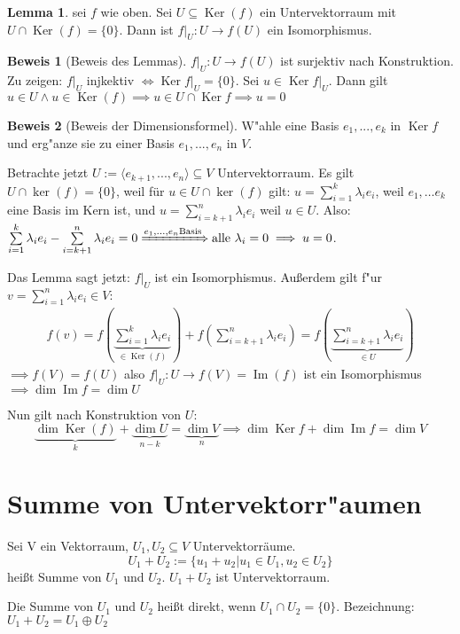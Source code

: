 \documentclass[oneside,fontsize=11pt,paper=a4,BCOR=0mm,DIV=12,automark,headsepline]{scrbook}
\DeclareMathOperator{\mdim}{dim}
\DeclareMathOperator{\mKer}{Ker}
\DeclareMathOperator{\mIm}{Im}
\theoremstyle{remark}
\theoremstyle{definition}
\newtheorem{lemma}{Lemma}[section]
\theoremstyle{definition}
\newtheorem*{prof}{Beweis}
\theoremstyle{remark}
\begin{document}
\begin{lemma} sei \(f\) wie oben. Sei \(U \subseteq \mKer(f)\) ein Untervektorraum mit \(U \cap \mKer(f) = \{0\}\).  Dann ist \(f|_U:U\to f(U)\) ein Isomorphismus.
\end{lemma}

\begin{prof}[Beweis des Lemmas]
  \(f|_U:U\to f(U)\) ist surjektiv nach Konstruktion. Zu zeigen: \(f|_U\) injkektiv \(\iff \mKer f|_U = \{0\}\). Sei \(u\in \mKer f|_U \). Dann gilt \(u\in U \land u \in \mKer(f) \implies u \in U \cap \mKer f \implies u = 0\)
\end{prof}

\begin{prof}[Beweis der Dimensionsformel]
  W"ahle eine Basis \({e_1, ..., e_k}\) in \(\mKer f\) und erg"anze sie zu einer Basis
  \({e_1, ..., e_n}\) in \(V\).

  Betrachte jetzt \(U:=\langle e_{k+1}, ..., e_n\rangle \subseteq V\) Untervektorraum. Es gilt $U \cap \ker(f) = \{0\}$, weil für $u\in U \cap \ker(f)$ gilt: \(u = \sum\limits_{i=1}^k \lambda_ie_i \), weil \(e_1, \dots e_k\) eine Basis im Kern ist, und \(u = \sum\limits_{i=k+1}^{n} \lambda_i e_i\) weil \(u\in U\). Also: \(\sum\limits_{i=1}^k \lambda_ie_i - \sum\limits_{i=k+1}^{n} \lambda_ie_i = 0 \xRightarrow{e_1,\dots, e_n \text{Basis}} \text{alle }\lambda_i = 0 \implies u =0\).

  Das Lemma sagt jetzt: \(f|_U\) ist ein Isomorphismus. Außerdem gilt f"ur \(v =\sum\limits_{i=1}^{n}\lambda_ie_i \in V:\)
  \begin{align*}
    f(v) = f\left(\underbrace{\sum_{i=1}^{k}\lambda_ie_i}_{\in \mKer(f)}\right) + f\left(\sum_{i=k+1}^{n}\lambda_ie_i\right) = f\left(\underbrace{\sum_{i=k+1}^{n} \lambda_ie_i}_{\in U}\right)
  \end{align*}
  \(\implies f(V)=f(U)\) also \(f|_U : U\to f(V) = \mIm(f) \) ist ein Isomorphismus \(\implies \mdim \mIm f = \mdim U \)

  Nun gilt nach Konstruktion von \(U\): \[\underbrace{\mdim \mKer(f)}_{k} + \underbrace{\mdim U}_{n-k} = \underbrace{\mdim V}_{n} \implies \mdim\mKer f + \mdim\mIm f = \mdim V \]
\end{prof}

\section{Summe von Untervektorr"aumen}
\label{sec:org83dfe63}
\begin{definition}{}{}
  Sei V ein Vektorraum, $U_1, U_2 \subseteq V$ Untervektorräume.
  \[U_1 + U_2 := \{u_1+u_2 | u_1 \in U_1, u_2 \in U_2\}\]
  heißt Summe von $U_1$ und $U_2$.
  $U_1 + U_2$ ist Untervektorraum.
  
\end{definition}
\begin{definition}{}{}
  Die Summe von $U_1$ und $U_2$ heißt direkt, wenn $U_1 \cap U_2 = \{0\}$. Bezeichnung: $U_1 + U_2 = U_1 \oplus U_2$
\end{definition}
\end{document}
